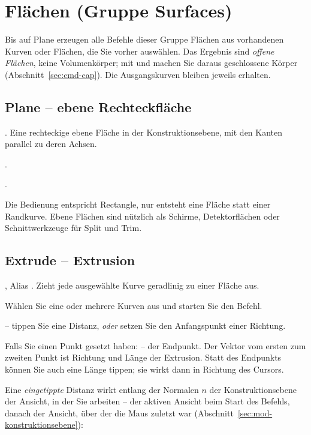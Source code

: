 \section{Flächen (Gruppe Surfaces)}\label{sec:gruppe-surfaces}

Bis auf Plane erzeugen alle Befehle dieser Gruppe Flächen aus vorhandenen Kurven oder Flächen,
die Sie vorher auswählen. Das Ergebnis sind \emph{offene Flächen}, keine Volumenkörper; mit
 und  machen Sie daraus geschlossene Körper
(Abschnitt~\ref{sec:cmd-cap}). Die Ausgangskurven bleiben jeweils erhalten.

\subsection{Plane -- ebene Rechteckfläche}\label{sec:cmd-plane}
. Eine rechteckige ebene Fläche in der Konstruktionsebene, mit den Kanten parallel zu
deren Achsen.
\begin{schritte}
\item {}.
\item {}.
\end{schritte}
Die Bedienung entspricht Rectangle, nur entsteht eine Fläche statt einer Randkurve. Ebene
Flächen sind nützlich als Schirme, Detektorflächen oder Schnittwerkzeuge für Split und Trim.

\subsection{Extrude -- Extrusion}\label{sec:cmd-extrude}
, Alias . Zieht jede ausgewählte Kurve geradlinig zu einer Fläche aus.
\begin{schritte}
\item Wählen Sie eine oder mehrere Kurven aus und starten Sie den Befehl.
\item {}
  -- tippen Sie eine Distanz, \emph{oder} setzen Sie den Anfangspunkt einer Richtung.
\item Falls Sie einen Punkt gesetzt haben:  -- der
  Endpunkt. Der Vektor vom ersten zum zweiten Punkt ist Richtung und Länge der Extrusion. Statt
  des Endpunkts können Sie auch eine Länge tippen; sie wirkt dann in Richtung des Cursors.
\end{schritte}
Eine \emph{eingetippte} Distanz wirkt entlang der Normalen $n$ der Konstruktionsebene der
Ansicht, in der Sie arbeiten -- der aktiven Ansicht beim Start des Befehls, danach der Ansicht,
über der die Maus zuletzt war (Abschnitt~\ref{sec:mod-konstruktionsebene}):

